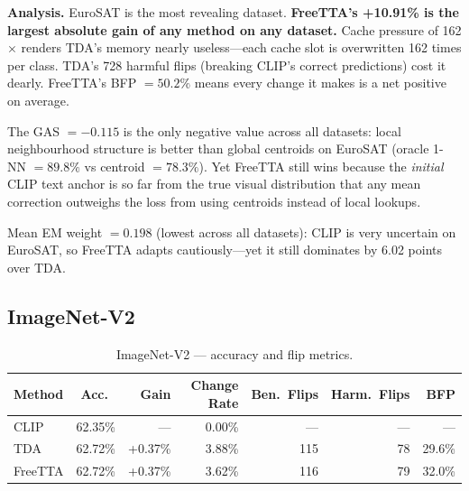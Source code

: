 \documentclass[12pt,a4paper]{article}
\newcommand{\1}{\mathbf{1}}
\begin{document}
\textbf{Analysis.}
EuroSAT is the most revealing dataset.
\textbf{FreeTTA's +10.91\% is the largest absolute gain of any method on any dataset.}
Cache pressure of 162$\times$ renders TDA's memory nearly useless---each cache slot is overwritten 162 times per class.
TDA's 728 harmful flips (breaking CLIP's correct predictions) cost it dearly.
FreeTTA's BFP $= 50.2\%$ means every change it makes is a net positive on average.

The GAS $= -0.115$ is the only negative value across all datasets: local neighbourhood structure is better than global centroids on EuroSAT (oracle 1-NN $= 89.8\%$ vs centroid $= 78.3\%$).
Yet FreeTTA still wins because the \emph{initial} CLIP text anchor is so far from the true visual distribution that any mean correction outweighs the loss from using centroids instead of local lookups.

Mean EM weight $= 0.198$ (lowest across all datasets): CLIP is very uncertain on EuroSAT, so FreeTTA adapts cautiously---yet it still dominates by 6.02 points over TDA.

\subsection{ImageNet-V2}

\begin{table}[H]
\centering
\caption{ImageNet-V2 --- accuracy and flip metrics.}
\label{tab:imagenet_flip}
\begin{tabular}{@{}lrrrrrr@{}}
\toprule
Method & Acc.\ & Gain & Change Rate & Ben.\ Flips & Harm.\ Flips & BFP \\
\midrule
CLIP    & 62.35\% & ---    & 0.00\% & ---  & ---  & --- \\
TDA     & 62.72\% & +0.37\% & 3.88\% & 115  & 78   & 29.6\% \\
FreeTTA & 62.72\% & +0.37\% & 3.62\% & 116  & 79   & 32.0\% \\
\bottomrule
\end{tabular}
\end{table}
\end{document}
